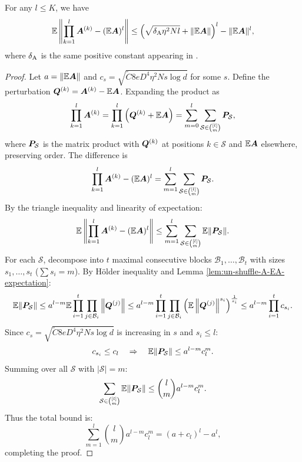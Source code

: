 \begin{lemma} \label{lem:shuffle-poly-A-EA-expectation}
    For any $l \leq K$, we have
    \[
    \mathbb{E}\left\|\prod_{k=1}^l{\bm{A}}^{(k)} - (\mathbb{E}{\bm{A}})^l \right\| 
    \leq \left(\sqrt{\delta_{\mathrm{A}}\eta^2Nl} + \|\mathbb{E} {\bm{A}}\|\right)^l - \|\mathbb{E}{\bm{A}}\|^l,
    \]
    where $\delta_{\mathrm{A}}$ is the same positive constant appearing in .
\end{lemma}
\begin{proof}
Let $a = \|\mathbb{E}{\bm{A}}\|$ and $c_s = \sqrt{\widetilde{C}8eD^4\eta^2Ns\log d}$ for some $s$. Define the perturbation ${\bm{Q}}^{(k)} = {\bm{A}}^{(k)} - \mathbb{E}{\bm{A}}$. Expanding the product as
\[
\prod_{k=1}^l{\bm{A}}^{(k)} = \prod_{k=1}^l \left({\bm{Q}}^{(k)} + \mathbb{E}{\bm{A}}\right) = \sum_{m=0}^l \sum_{\mathcal{S} \in \binom{[l]}{m}} {\bm{P}}_{\mathcal{S}},
\]
where ${\bm{P}}_{\mathcal{S}}$ is the matrix product with ${\bm{Q}}^{(k)}$ at positions $k \in \mathcal{S}$ and $\mathbb{E}{\bm{A}}$ elsewhere, preserving order. The difference is
\[
\prod_{k=1}^l{\bm{A}}^{(k)} - (\mathbb{E}{\bm{A}})^l = \sum_{m=1}^l \sum_{\mathcal{S} \in \binom{[l]}{m}} {\bm{P}}_{\mathcal{S}}.
\]
By the triangle inequality and linearity of expectation:
\[
\mathbb{E}\left\|\prod_{k=1}^l{\bm{A}}^{(k)} - (\mathbb{E}{\bm{A}})^l\right\| \leq \sum_{m=1}^l \sum_{\mathcal{S} \in \binom{[l]}{m}} \mathbb{E}\|{\bm{P}}_{\mathcal{S}}\|.
\]
For each $\mathcal{S}$, decompose into $t$ maximal consecutive blocks $\mathcal{B}_1, \dots, \mathcal{B}_t$ with sizes $s_1, \dots, s_t$ ($\sum s_i = m$). By Hölder inequality and Lemma \ref{lem:un-shuffle-A-EA-expectation}:
\[
\mathbb{E}\|{\bm{P}}_{\mathcal{S}}\| \leq a^{l-m} \mathbb{E}\prod_{i=1}^t \prod_{j \in \mathcal{B}_i}\left\|{\bm{Q}}^{(j)}\right\| \leq a^{l-m} \prod_{i=1}^t \prod_{j \in \mathcal{B}_i}\left(\mathbb{E}\left\|{\bm{Q}}^{(j)}\right\|^{s_i}\right)^{\frac{1}{s_i}}\leq a^{l-m} \prod_{i=1}^t c_{s_i}.
\]
Since $c_s = \sqrt{\widetilde{C}8eD^4\eta^2Ns\log d}$ is increasing in $s$ and $s_i \leq l$:
\[
c_{s_i} \leq c_l \quad \Rightarrow \quad \mathbb{E}\|{\bm{P}}_{\mathcal{S}}\| \leq a^{l-m} c_l^{m}.
\]
Summing over all $\mathcal{S}$ with $|\mathcal{S}| = m$:
\[
\sum_{\mathcal{S} \in \binom{[l]}{m}} \mathbb{E}\|{\bm{P}}_{\mathcal{S}}\| \leq \binom{l}{m} a^{l-m} c_l^{m}.
\]
Thus the total bound is:
\[
\sum_{m=1}^l \binom{l}{m} a^{l-m} c_l^{m} = (a + c_l)^l - a^l,
\]
completing the proof.
\end{proof}
